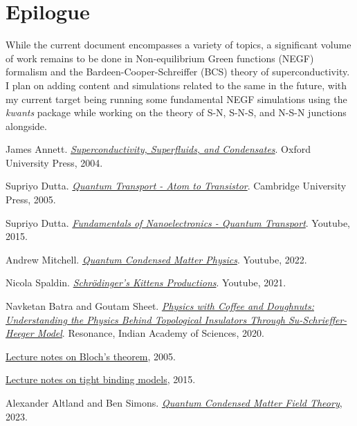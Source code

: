 \documentclass{resonance}
\begin{document}
\newpage

\section{Epilogue}

While the current document encompasses a variety of topics, a significant volume of work remains to be done in Non-equilibrium Green functions (NEGF) formalism and the Bardeen-Cooper-Schreiffer (BCS) theory of superconductivity. I plan on adding content and simulations related to the same in the future, with my current target being running some fundamental NEGF simulations using the \textit{kwants} package while working on the theory of S-N, S-N-S, and N-S-N junctions alongside.  

\clearpage

\begin{thebibliography}{99} 
James Annett.
 \href{https://webuser.unicas.it/pagliarone/Super.pdf}{\textit{Superconductivity, Superfluids, and Condensates}}. 
Oxford University Press, 2004.

Supriyo Dutta.
 \href{https://www.cambridge.org/core/books/quantum-transport/E96BE74AACD59A03A7D6A7F7DACDFB71}{\textit{Quantum Transport - Atom to Transistor}}.
Cambridge University Press, 2005.

Supriyo Dutta.
 \href{https://www.youtube.com/watch?v=eg4krA0xH6I}{\textit{Fundamentals of Nanoelectronics - Quantum Transport}}.
Youtube, 2015.

Andrew Mitchell. 
 \href{https://www.youtube.com/playlist?list=PLotxEOxVaaoKRXdDN-7lI3Y88PaHqyOZL}{\textit{Quantum Condensed Matter Physics}}. 
Youtube, 2022.

Nicola Spaldin. 
\href{https://www.youtube.com/playlist?list=PL8n8OkcK9SRZwL24mF7FeOa50Xd9YB-JO}{\textit{Schrödinger's Kittens Productions}}. Youtube, 2021.

Navketan Batra and Goutam Sheet. 
 \href{https://link.springer.com/article/10.1007/s12045-020-0995-x}{\textit{Physics with Coffee and Doughnuts: Understanding the Physics Behind Topological Insulators Through Su-Schrieffer-Heeger Model}}.
Resonance, Indian Academy of Sciences, 2020.

\href{https://bohr.physics.berkeley.edu/classes/221/s07/notes/blochban.pdf}{Lecture notes on Bloch's theorem}, 2005.

\href{https://www.physics.rutgers.edu/~eandrei/chengdu/reading/tight-binding.pdf}{Lecture notes on tight binding models}, 2015.

Alexander Altland and Ben Simons.
\href{https://www.tcm.phy.cam.ac.uk/~bds10/tp3/secqu.pdf}{\textit{Quantum Condensed Matter Field Theory}}, 2023.
\end{thebibliography}
\end{document}
